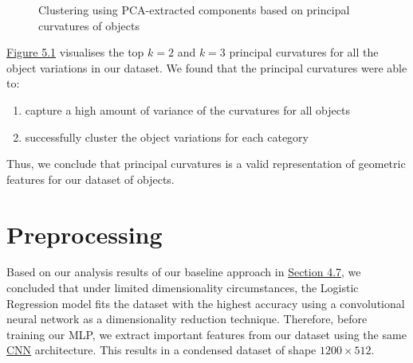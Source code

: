 \documentclass[11pt, a4paper]{report}
\begin{document}
\vspace*{-0.7cm}
\begin{figure}[H]%
    \centering
    \qquad
    \caption{Clustering using PCA-extracted components based on principal curvatures of objects}%
    \label{fig:5.1}%
\end{figure}

\hyperref[fig:5.1]{Figure 5.1} visualises the top $k=2$ and $k=3$ principal curvatures for all the object variations in our dataset. We found that the principal curvatures were able to:
\begin{enumerate}
    \item capture a high amount of variance of the curvatures for all objects
    \item successfully cluster the object variations for each category
\end{enumerate}
\noindent Thus, we conclude that principal curvatures is a valid representation of geometric features for our dataset of objects.


\section{Preprocessing}
\label{sec:5.3}
Based on our analysis results of our baseline approach in \hyperref[sec:4.7]{Section 4.7}, we concluded that under limited dimensionality circumstances, the Logistic Regression model fits the dataset with the highest accuracy using a convolutional neural network as a dimensionality reduction technique. Therefore, before training our MLP, we extract important features from our dataset using the same \hyperref[fig:4.5]{CNN} architecture. This results in a condensed dataset of shape $1200\times512$.\\
\end{document}
